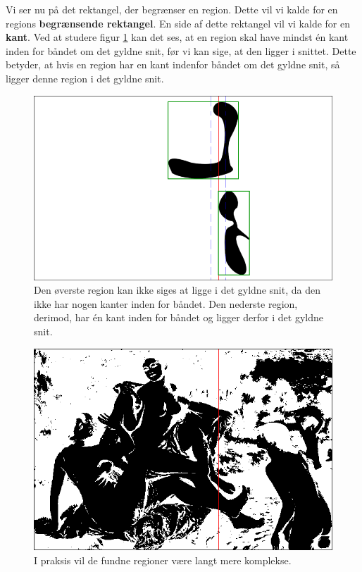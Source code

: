 {Vi ser nu på det rektangel, der begrænser en region. Dette vil vi kalde
for en regions \textbf{begrænsende rektangel}. En side af dette
rektangel vil vi kalde for en \textbf{kant}. Ved at studere figur
\ref{bbox_section} kan det ses, at en region skal have mindst én kant
inden for båndet om det gyldne snit, før vi kan sige, at den ligger i
snittet. Dette betyder, at hvis en region har en kant indenfor båndet om
det gyldne snit, så ligger denne region i det gyldne snit.

\begin{figure}[p]
    \begin{center}
        \includegraphics[scale=\imgscale,angle=0]{afsnit/vores_implementation/billeder/naiv_algoritme/bbox_section}
    \end{center}
    \caption[Begrænsende rektangler]{Den øverste region kan ikke
    siges at ligge i det gyldne snit, da den ikke har nogen kanter
    inden for båndet. Den nederste region, derimod, har én kant
    inden for båndet og ligger derfor i det gyldne snit.}
    \label{bbox_section}
\end{figure}

\begin{figure}[p]
    \begin{center}
        \includegraphics[scale=0.42,angle=0]{afsnit/vores_implementation/billeder/naiv_algoritme/bathers_mockup_blob}
    \end{center}
    \caption[Interessante regioner i praksis]{I praksis vil de
    fundne regioner være langt mere komplekse.}
    \label{realworld_example}
\end{figure}

}
